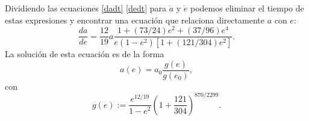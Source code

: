 Dividiendo las ecuaciones \eqref{dadt} \eqref{dedt} para $\dot{a}$ y $\dot{e}$ podemos eliminar el tiempo de estas expresiones y encontrar una ecuación que relaciona directamente $a$ con $e$:
\begin{equation}
\frac{da}{de}=\frac{12}{19}a\frac{1+(73/24)e^2+(37/96)e^4}{e(1-e^2)[1+(121/304)e^2]}.
\end{equation}
La solución de esta ecuación es de la forma
\begin{equation}
a(e)=a_{0}\frac{g(e)}{g(e_{0})},
\end{equation}
con 
\begin{equation}
g(e):= \frac{e^{12/19}}{1-e^2}\left(1+\frac{121}{304} \right)^{870/2299}.
\end{equation}

%
%
%
%
